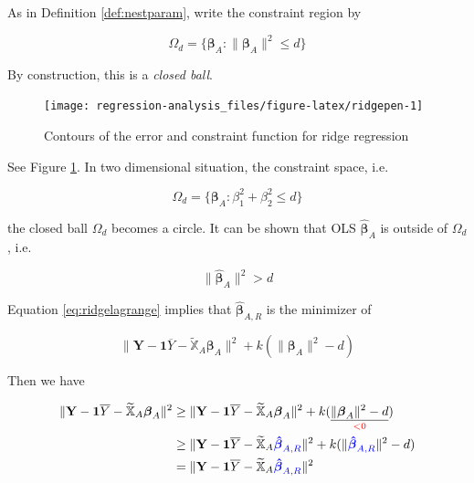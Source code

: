\documentclass[]{book}
\theoremstyle{definition}
\theoremstyle{definition}
\theoremstyle{definition}
\theoremstyle{remark}
\begin{document}
As in Definition \ref{def:nestparam}, write the constraint region by

\[\Omega_d = \{ \boldsymbol\beta_A : \lVert \boldsymbol\beta_A \rVert^2 \le d \}\]

By construction, this is a \emph{closed ball}.

\begin{figure}[H]

{\centering \texttt{[image: regression-analysis\_files/figure-latex/ridgepen-1]} 

}

\caption{Contours of the error and constraint function for ridge regression}\label{fig:ridgepen}
\end{figure}

See Figure \ref{fig:ridgepen}. In two dimensional situation, the constraint space, i.e.

\[\Omega_d = \{ \boldsymbol\beta_A : \beta_1^2 + \beta_2^2 \le d \}\]

the closed ball \(\Omega_d\) becomes a circle. It can be shown that OLS \(\boldsymbol{\hat\beta}_{A}\) is outside of \(\Omega_d\), i.e.

\[\lVert \boldsymbol{\hat\beta}_{A} \rVert^2 > d\]

Equation \eqref{eq:ridgelagrange} implies that \(\boldsymbol{\hat\beta}_{A, R}\) is the minimizer of

\[\lVert \mathbf{Y} - \mathbf{1} \overline{Y} - \widetilde{\mathbb{X}}_A \boldsymbol\beta_A \rVert^2 + k ( \lVert \boldsymbol\beta_A \rVert^2 - d)\]

Then we have

\begin{equation*}
  \begin{split}
    \lVert \mathbf{Y} - \mathbf{1} \overline{Y} - \widetilde{\mathbb{X}}_A \boldsymbol\beta_A \rVert^2 & \ge \lVert \mathbf{Y} - \mathbf{1} \overline{Y} - \widetilde{\mathbb{X}}_A \boldsymbol\beta_A \rVert^2 + k ( \underset{\color{red}{< 0}}{\underline{\lVert \boldsymbol\beta_A \rVert^2 - d}} ) \\
    & \ge \lVert \mathbf{Y} - \mathbf{1} \overline{Y} - \widetilde{\mathbb{X}}_A {\color{blue}{\boldsymbol{\hat\beta}_{A, R}}} \rVert^2 + k ( \lVert {\color{blue}{\boldsymbol{\hat\beta}_{A, R}}} \rVert^2 - d) \\
    & = \lVert \mathbf{Y} - \mathbf{1} \overline{Y} - \widetilde{\mathbb{X}}_A {\color{blue}{\boldsymbol{\hat\beta}_{A, R}}} \rVert^2
  \end{split}
\end{equation*}
\end{document}
